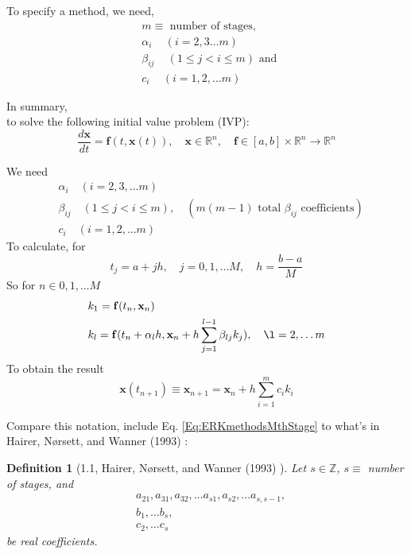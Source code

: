 \documentclass[10pt]{amsart}
\newtheorem{definition}{Definition}
\begin{document}
\begin{multicols*}{2}
To specify a method, we need, 
\begin{equation}
\begin{aligned}
	& m \equiv \text{ number of stages, } \\
	& \alpha_i \quad \, (i= 2, 3 \dots m) \\
	& \beta_{ij} \quad \, (1 \leq j < i \leq m) \text{ and } \\
	& c_i \quad \, (i = 1, 2, \dots m)	
\end{aligned}
\end{equation}

In summary, \\
to solve the following initial value problem (IVP):
\begin{equation}
\boxed{
\frac{d\mathbf{x}}{dt} = \mathbf{f}(t, \mathbf{x}(t)), \quad \mathbf{x} \in \mathbb{R}^n, \quad \mathbf{f} \in [a, b] \times \mathbb{R}^n \to \mathbb{R}^n
}
\end{equation}

We need
\begin{equation}
\begin{aligned}
& \alpha_i \quad (i = 2, 3, \dots m) \\
& \beta_{ij} \quad (1 \leq j < i \leq m) , \quad (m(m-1) \text{ total $\beta_{ij}$ coefficients}) \\
& c_i  \quad (i = 1, 2, \dots m)	
\end{aligned}
\end{equation}
To calculate, for 
\begin{equation}
	\boxed{
		t_j = a+jh, \quad j=0, 1, \dots M, \quad h = \frac{b-a}{M} }
\end{equation}
So for $n \in 0 ,1 ,\dots M$
\begin{equation}
	\begin{aligned}
& 	k_1 = \mathbf{f}(t_n, \mathbf{x}_n) \\
& k_l = \mathbf{f}(t_n + \alpha_l h, \mathbf{x}_n + h \sum_{j=1}^{l-1} \beta_{lj} k_j) , \quad \l = 2, \dots m
	\end{aligned}	
\end{equation}
To obtain the result
\begin{equation}
	\mathbf{x}(t_{n+1}) \equiv \mathbf{x}_{n+1} = \mathbf{x}_{n} + h \sum_{i=1}^m c_i k_i
\end{equation}

Compare this notation, include Eq. \ref{Eq:ERKmethodsMthStage} to what's in Hairer, N\o rsett, and Wanner (1993) \cite{HNW1993}:

\begin{definition}[1.1, Hairer, N\o rsett, and Wanner (1993) \cite{HNW1993}]
	Let $s \in \mathbb{Z}$, $s \equiv $ number of stages, and 
	\begin{equation}
		\begin{aligned}
			& a_{21}, a_{31}, a_{32}, \dots a_{s1}, a_{s2}, \dots a_{s,s-1}, \\
			& b_1, \dots b_s, \\
			& c_2, \dots c_s
		\end{aligned}
	\end{equation}
be real coefficients.


\end{definition}
\end{multicols*}
\end{document}
